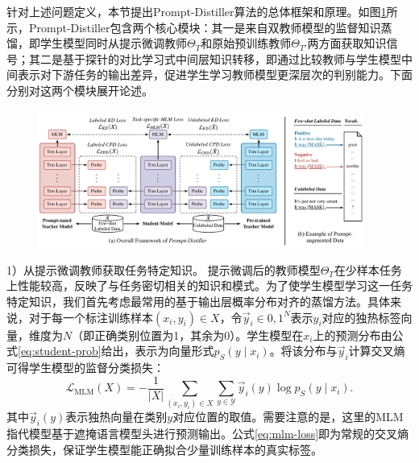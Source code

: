 \documentclass[../main.tex]{subfiles}
\begin{document}
\label{sec:3-3}
针对上述问题定义，本节提出Prompt-Distiller算法的总体框架和原理。如图\ref{fig:PromptDistillerFramework}所示，Prompt-Distiller包含两个核心模块：其一是来自双教师模型的监督知识蒸馏，即学生模型同时从提示微调教师$\Theta_T$和原始预训练教师$\Theta_{T'}$两方面获取知识信号；其二是基于探针的对比学习式中间层知识转移，即通过比较教师与学生模型中间表示对下游任务的输出差异，促进学生学习教师模型更深层次的判别能力。下面分别对这两个模块展开论述。

\begin{figure}[htbp]
	\centering
	\includegraphics[width=0.95\textwidth]{Prompt-Distiller/framework.pdf}
	\label{fig:PromptDistillerFramework}
\end{figure}

\label{sec:3-3-1}
1）从提示微调教师获取任务特定知识。 提示微调后的教师模型$\Theta_T$在少样本任务上性能较高，反映了与任务密切相关的知识和模式。为了使学生模型学习这一任务特定知识，我们首先考虑最常用的基于输出层概率分布对齐的蒸馏方法。具体来说，对于每一个标注训练样本$(x_i, y_i) \in X$，令$\vec{y}_i \in {0,1}^N$表示$y_i$对应的独热标签向量，维度为$N$（即正确类别位置为1，其余为0）。学生模型在$x_i$上的预测分布由公式\eqref{eq:student-prob}给出，表示为向量形式$p_S(y\mid x_i)$。将该分布与$\vec{y}_i$计算交叉熵可得学生模型的监督分类损失：
\begin{equation}
	\label{eq:mlm-loss}
	\mathcal{L}_{\text{MLM}}(X) = -\frac{1}{|X|} \sum_{(x_i, y_i)\in X} \sum_{y \in \mathcal{Y}} \vec{y}_i(y)\log p_S(y \mid x_i) .
\end{equation}
其中$\vec{y}_i(y)$表示独热向量在类别$y$对应位置的取值。需要注意的是，这里的MLM指代模型基于遮掩语言模型头进行预测输出。公式\eqref{eq:mlm-loss}即为常规的交叉熵分类损失，保证学生模型能正确拟合少量训练样本的真实标签。
\end{document}
